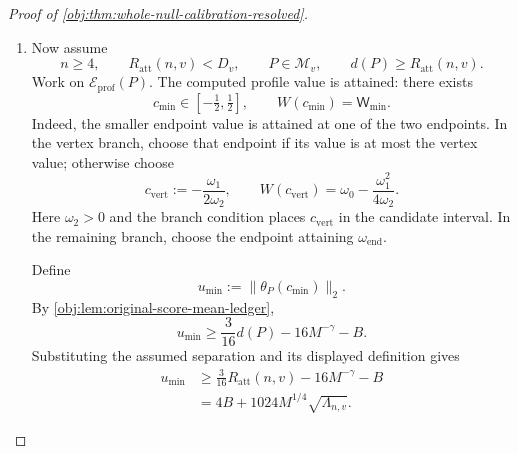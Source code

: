 \documentclass[11pt]{article}
\begin{document}
\begin{proof}[Proof of \cref{obj:thm:whole-null-calibration-resolved}]
\begin{enumerate}
Combining these bounds with the preceding step, on \(\mathcal E_{\mathrm{prof}}(P)\),
\[
\mathsf W_{\min}
\le W(c_0)
\le2B^2+65536\sqrt M\,\Lambda_{n,v}
\le h_{n,v}.
\]
The strict rejection rule in \cref{obj:def:explicit-score-ledger} consequently gives
\[
\psi_{n,v}(\text{sample},\text{seed})=0
\quad\text{on }\mathcal E_{\mathrm{prof}}(P)\times[0,1].
\]

Define the experiment measure and its good event by
\[
\mathbb P_{\mathrm{exp}}:=P^{\otimes n}\otimes\lambda,
\qquad
\mathcal E_{\mathrm{exp}}(P)
:=\mathcal E_{\mathrm{prof}}(P)\times[0,1].
\]
Independence and the unit mass of \(\lambda\) imply
\[
\mathbb P_{\mathrm{exp}}\!\left(\mathcal E_{\mathrm{exp}}(P)\right)
=
P^{\otimes n}\!\left(\mathcal E_{\mathrm{prof}}(P)\right).
\]
The test takes values in \([0,1]\), so pointwise
\[
0\le\psi_{n,v}
\le\mathbf1_{\mathcal E_{\mathrm{exp}}(P)^c}.
\]
Integrating this inequality gives
\[
\begin{aligned}
\mathsf R_n(P,\psi_{n,v})
&\le
\mathbb P_{\mathrm{exp}}\!\left(\mathcal E_{\mathrm{exp}}(P)^c\right)\\
&=1-P^{\otimes n}\!\left(\mathcal E_{\mathrm{prof}}(P)\right)\\
&\le0.0075.
\end{aligned}
\]
For \(n<4\), the zero-test branch gives directly
\[
\mathsf R_n(P,\psi_{n,v})=0\le0.0075.
\]

\item Now assume
\[
n\ge4,
\qquad
R_{\mathrm{att}}(n,v)<D_v,
\qquad
P\in\mathcal M_v,
\qquad
d(P)\ge R_{\mathrm{att}}(n,v).
\]
Work on \(\mathcal E_{\mathrm{prof}}(P)\). The computed profile value is attained: there exists
\[
c_{\min}\in[-\tfrac12,\tfrac12],
\qquad
W(c_{\min})=\mathsf W_{\min}.
\]
Indeed, the smaller endpoint value is attained at one of the two endpoints. In the vertex branch, choose that endpoint if its value is at most the vertex value; otherwise choose
\[
c_{\mathrm{vert}}:=-\frac{\omega_1}{2\omega_2},
\qquad
W(c_{\mathrm{vert}})
=\omega_0-\frac{\omega_1^2}{4\omega_2}.
\]
Here \(\omega_2>0\) and the branch condition places \(c_{\mathrm{vert}}\) in the candidate interval. In the remaining branch, choose the endpoint attaining \(\omega_{\mathrm{end}}\).

Define
\[
u_{\min}:=\|\theta_P(c_{\min})\|_2.
\]
By \cref{obj:lem:original-score-mean-ledger},
\[
u_{\min}
\ge\frac{3}{16}d(P)-16M^{-\gamma}-B.
\]
Substituting the assumed separation and its displayed definition gives
\[
\begin{aligned}
u_{\min}
&\ge
\frac{3}{16}R_{\mathrm{att}}(n,v)-16M^{-\gamma}-B\\
&=4B+1024M^{1/4}\sqrt{\Lambda_{n,v}}.
\end{aligned}
\]


\end{enumerate}
\end{proof}
\end{document}
